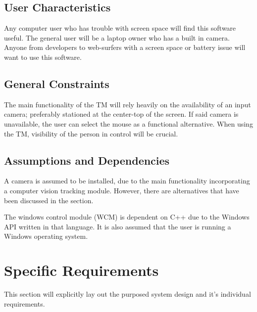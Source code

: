 \documentclass[titlepage]{article}
\begin{document}

\subsection{User Characteristics}
Any computer user who has trouble with screen space will find this software useful. The general user will be a laptop owner who has a built in camera. Anyone from developers to web-surfers with a screen space or battery issue will want to use this software.

\subsection{General Constraints}
\label{General Constraints}
The main functionality of the TM will rely heavily on the availability of an input camera; preferably stationed at the center-top of the screen. If said camera is unavailable, the user can select the mouse as a functional alternative. When using the TM, visibility of the person in control will be crucial.

\subsection{Assumptions and Dependencies}
A camera is assumed to be installed, due to the main functionality incorporating a computer vision tracking module. However, there are alternatives that have been discussed in the  section.

The windows control module (WCM) is dependent on C++ due to the Windows API written in that language. It is also assumed that the user is running a Windows operating system.

\section{Specific Requirements}
This section will explicitly lay out the purposed system design and it's individual requirements.
\label{Specific Requirements}

\end{document}
